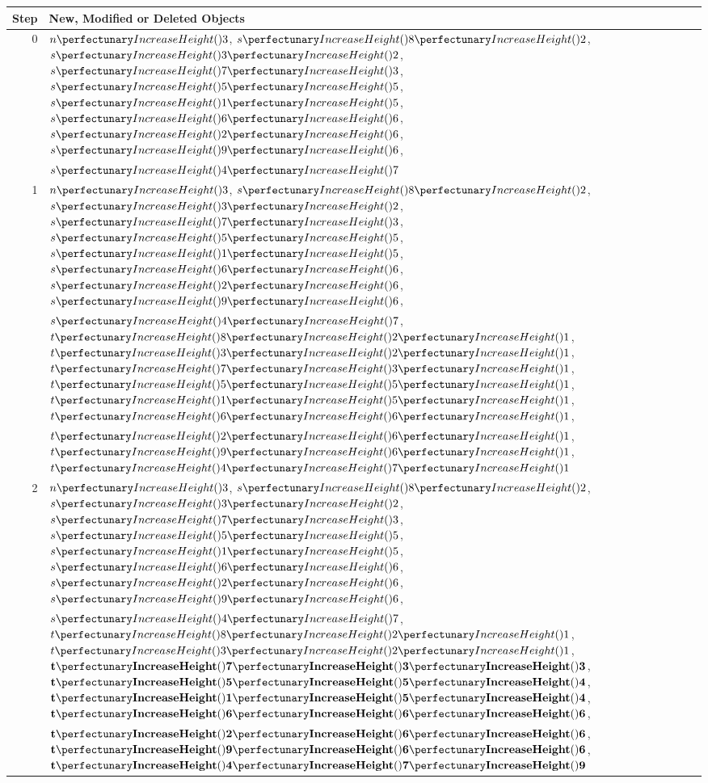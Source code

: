 \begin{table} \centering
   \begin{tabular}{|r|l|}
    \hline
    \textbf{Step} & \textbf{New, Modified or Deleted Objects} \\ \hline
    0 & \(\cpfunc{n}{3}\), \(\cpfuncn{s}{8}{2}\), \(\cpfuncn{s}{3}{2}\), \(\cpfuncn{s}{7}{3}\), \(\cpfuncn{s}{5}{5}\), \(\cpfuncn{s}{1}{5}\), \(\cpfuncn{s}{6}{6}\), \(\cpfuncn{s}{2}{6}\), \(\cpfuncn{s}{9}{6}\),\\& \(\cpfuncn{s}{4}{7}\)\\ \hline
    
    1 & \(\cpfunc{n}{3}\), \(\cpfuncn{s}{8}{2}\), \(\cpfuncn{s}{3}{2}\), \(\cpfuncn{s}{7}{3}\), \(\cpfuncn{s}{5}{5}\), \(\cpfuncn{s}{1}{5}\), \(\cpfuncn{s}{6}{6}\), \(\cpfuncn{s}{2}{6}\), \(\cpfuncn{s}{9}{6}\),\\& \(\cpfuncn{s}{4}{7}\), \(\cpfuncnn{t}{8}{2}{1}\), \(\cpfuncnn{t}{3}{2}{1}\), \(\cpfuncnn{t}{7}{3}{1}\), \(\cpfuncnn{t}{5}{5}{1}\), \(\cpfuncnn{t}{1}{5}{1}\), \(\cpfuncnn{t}{6}{6}{1}\),\\& \(\cpfuncnn{t}{2}{6}{1}\), \(\cpfuncnn{t}{9}{6}{1}\), \(\cpfuncnn{t}{4}{7}{1}\)\\ \hline
    
    2 & \(\cpfunc{n}{3}\), \(\cpfuncn{s}{8}{2}\), \(\cpfuncn{s}{3}{2}\), \(\cpfuncn{s}{7}{3}\), \(\cpfuncn{s}{5}{5}\), \(\cpfuncn{s}{1}{5}\), \(\cpfuncn{s}{6}{6}\), \(\cpfuncn{s}{2}{6}\), \(\cpfuncn{s}{9}{6}\),\\& \(\cpfuncn{s}{4}{7}\), \(\cpfuncnn{t}{8}{2}{1}\), \(\cpfuncnn{t}{3}{2}{1}\), \(\mathbf{\cpfuncnn{t}{7}{3}{3}}\), \(\mathbf{\cpfuncnn{t}{5}{5}{4}}\), \(\mathbf{\cpfuncnn{t}{1}{5}{4}}\), \(\mathbf{\cpfuncnn{t}{6}{6}{6}}\),\\& \(\mathbf{\cpfuncnn{t}{2}{6}{6}}\), \(\mathbf{\cpfuncnn{t}{9}{6}{6}}\), \(\mathbf{\cpfuncnn{t}{4}{7}{9}}\)\\ \hline
    
    

\end{tabular}
\end{table}
